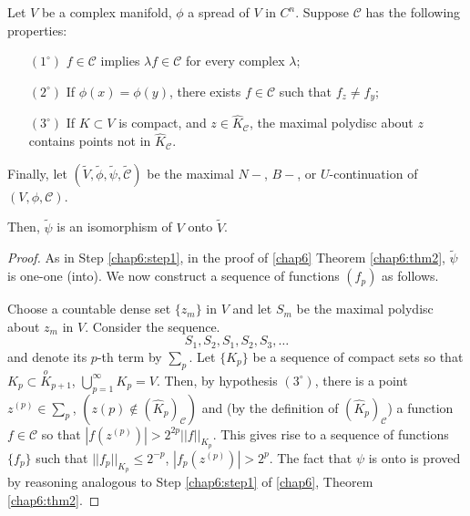 \begin{dashthm}\label{chap7:dashthm2}
Let $V$ be a complex manifold, $\phi$ a spread of $V$ in
  $C^n$. Suppose $\mathscr{C}$ has the following properties:
\begin{itemize}
\item[$(1^\circ)$] $f \in \mathscr{C}$ implies $\lambda f \in
  \mathscr{C}$ for every complex $\lambda$;

\item[$(2^\circ)$] If $\phi(x) = \phi(y)$, there exists $f\in
  \mathscr{C}$ such that $f_z \neq f_y$;

\item[$(3^\circ)$] If $K \subset V$ is compact, and $z
  \in\hat{K}_\mathscr{C}$, the maximal polydisc about $z$ contains
  points not in $\hat{K}_\mathscr{C}$.
\end{itemize}

Finally, let $(\tilde{V}, \tilde{\phi}, \tilde{\psi},
\tilde{\mathscr{C}})$ be the maximal $N-$, $B-$, or $U$-continuation
of $(V, \phi, \mathscr{C})$. 
\end{dashthm}

Then, $\tilde{\psi}$ is an isomorphism of $V$ onto $\tilde{V}$.

\begin{proof}
As in Step \ref{chap6:step1}, in the proof of \ref{chap6} Theorem
\ref{chap6:thm2}, $\tilde{\psi}$ is one-one (into). We now construct a
sequence of functions $(f_p)$ as follows. 

Choose a countable dense set $\{z_m\}$ in $V$ and let $S_m$ be the
maximal polydisc about $z_m$ in $V$. Consider the sequence.
$$
S_1, S_2, S_1, S_2, S_3, \ldots 
$$
and denote its $p$-th term by $\sum_p$. Let $\{K_p\}$ be a sequence of
compact sets so that $K_p \subset \overset{o}{K}_{p+1}$,
$\bigcup\limits^\infty_{p=1} K_p = V$. Then, by hypothesis
$(3^\circ)$, there is a point $z^{(p)} \in \sum_p$, $(z(p) \not\in
(\hat{K}_p)_{\mathscr{C}})$ and (by the definition of
$(\hat{K}_p)_{\mathscr{C}}$) a function $f \in\mathscr{C}$ so that
$|f(z^{(p)})| > 2^{2p} ||f ||_{K_p}$. This gives rise to a sequence of
functions $\{f_p\}$  such that $||f_p||_{K_p} \leq 2^{-p}$, $|f_p
(z^{(p)})|>2^p$. The fact that $\psi$ is onto is proved by reasoning
analogous to Step \ref{chap6:step1} of \ref{chap6}, Theorem \ref{chap6:thm2}. 
\end{proof}

